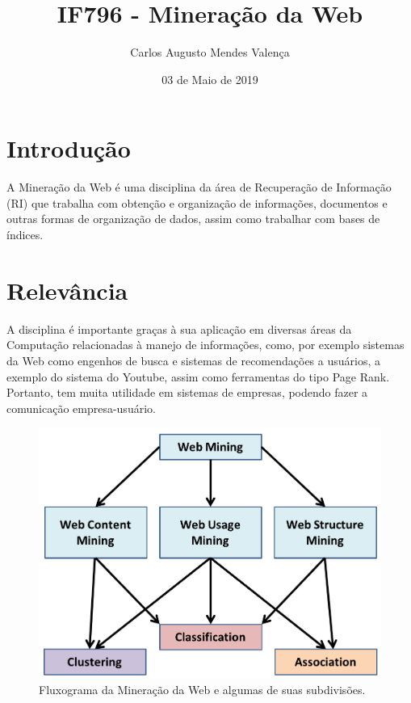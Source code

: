 \documentclass{article}
\title{IF796 - Mineração da Web}
\author{Carlos Augusto Mendes Valença}
\date{03 de Maio de 2019}
\begin{document}
\maketitle

\section{Introdução}
A Mineração da Web é uma disciplina da área de Recuperação de Informação (RI) que trabalha com obtenção e organização de informações, documentos e outras formas de organização de dados, assim como trabalhar com bases de índices. 

\section{Relevância}
A disciplina é importante graças à sua aplicação em diversas áreas da Computação relacionadas à manejo de informações, como, por exemplo sistemas da Web como engenhos de busca e sistemas de recomendações a usuários, a exemplo do sistema do Youtube, assim como ferramentas do tipo Page Rank. Portanto, tem muita utilidade em sistemas de empresas, podendo fazer a comunicação empresa-usuário.

\begin{figure}[h!]
\centering
\includegraphics[scale=0.4]{web_mining}
\caption{Fluxograma da Mineração da Web e algumas de suas subdivisões.}
\label{fig:web_mining}
\end{figure}
\end{document}
